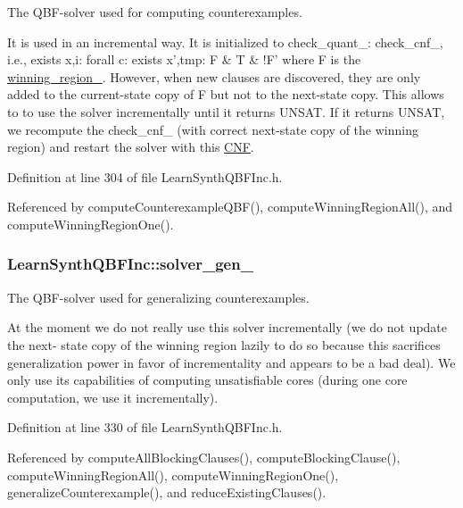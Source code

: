 The Q\-B\-F-\/solver used for computing counterexamples. 

It is used in an incremental way. It is initialized to check\-\_\-quant\-\_\-\-: check\-\_\-cnf\-\_\-, i.\-e., exists x,i\-: forall c\-: exists x',tmp\-: F \& T \& !\-F' where F is the \hyperlink{classLearnSynthQBFInc_abc3503bdb6be7053a7c3d3d7e57858d6}{winning\-\_\-region\-\_\-}. However, when new clauses are discovered, they are only added to the current-\/state copy of F but not to the next-\/state copy. This allows to to use the solver incrementally until it returns U\-N\-S\-A\-T. If it returns U\-N\-S\-A\-T, we recompute the check\-\_\-cnf\-\_\- (with correct next-\/state copy of the winning region) and restart the solver with this \hyperlink{classCNF}{C\-N\-F}. 

Definition at line 304 of file Learn\-Synth\-Q\-B\-F\-Inc.\-h.



Referenced by compute\-Counterexample\-Q\-B\-F(), compute\-Winning\-Region\-All(), and compute\-Winning\-Region\-One().

\hypertarget{classLearnSynthQBFInc_a8cb5e0c1c5516ac1d65537c64794ec0a}{
\subsubsection[{solver\-\_\-gen\-\_\-}]{ Learn\-Synth\-Q\-B\-F\-Inc\-::solver\-\_\-gen\-\_\-\hspace{0.3cm}{\ttfamily [protected]}}}\label{classLearnSynthQBFInc_a8cb5e0c1c5516ac1d65537c64794ec0a}


The Q\-B\-F-\/solver used for generalizing counterexamples. 

At the moment we do not really use this solver incrementally (we do not update the next-\/ state copy of the winning region lazily to do so because this sacrifices generalization power in favor of incrementality and appears to be a bad deal). We only use its capabilities of computing unsatisfiable cores (during one core computation, we use it incrementally). 

Definition at line 330 of file Learn\-Synth\-Q\-B\-F\-Inc.\-h.



Referenced by compute\-All\-Blocking\-Clauses(), compute\-Blocking\-Clause(), compute\-Winning\-Region\-All(), compute\-Winning\-Region\-One(), generalize\-Counterexample(), and reduce\-Existing\-Clauses().

